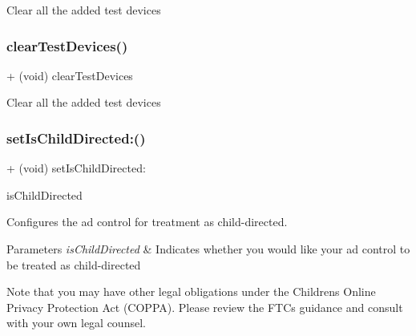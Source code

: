 Clear all the added test devices \mbox{\label{interfaceFBAdSettings_af6d62d5a096e6701bb83407114eb7dd6}} 
\subsubsection{\texorpdfstring{clear\+Test\+Devices()}{clearTestDevices()}\hspace{0.1cm}{\footnotesize\ttfamily [5/5]}}
{\footnotesize\ttfamily + (void) clear\+Test\+Devices \begin{DoxyParamCaption}{ }\end{DoxyParamCaption}}

Clear all the added test devices \mbox{\label{interfaceFBAdSettings_a0f1e7129f1c07b5420d9a6a1f7eb9768}} 
\subsubsection{\texorpdfstring{set\+Is\+Child\+Directed\+:()}{setIsChildDirected:()}\hspace{0.1cm}{\footnotesize\ttfamily [1/5]}}
{\footnotesize\ttfamily + (void) set\+Is\+Child\+Directed\+: \begin{DoxyParamCaption}\item[{(B\+O\+OL)}]{is\+Child\+Directed }\end{DoxyParamCaption}}

Configures the ad control for treatment as child-\/directed.


\begin{DoxyParams}{Parameters}
{\em is\+Child\+Directed} & Indicates whether you would like your ad control to be treated as child-\/directed\\
\hline
\end{DoxyParams}
Note that you may have other legal obligations under the Children\textquotesingle{}s Online Privacy Protection Act (C\+O\+P\+PA). Please review the F\+TC\textquotesingle{}s guidance and consult with your own legal counsel. \mbox{\label{interfaceFBAdSettings_a0f1e7129f1c07b5420d9a6a1f7eb9768}} 
